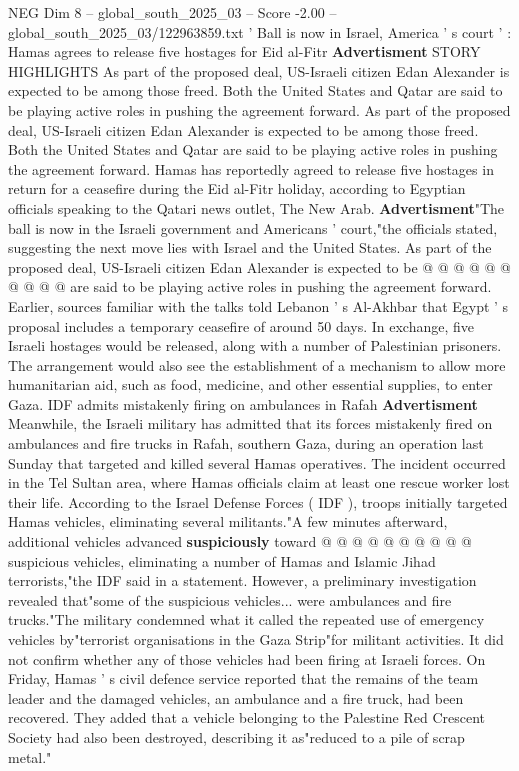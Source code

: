 \begin{textsample}{NEG Dim 8 – global\_south\_2025\_03 – Score -2.00 – global\_south\_2025\_03/122963859.txt}  \label{ex:f8_neg_071}
' Ball is now in Israel, America ' s court ' : Hamas agrees to release five hostages for Eid al-Fitr \textbf{Advertisment} STORY HIGHLIGHTS As part of the proposed deal, US-Israeli citizen Edan Alexander is expected to be among those freed.
Both the United States and Qatar are said to be playing active roles in pushing the agreement forward.
As part of the proposed deal, US-Israeli citizen Edan Alexander is expected to be among those freed.
Both the United States and Qatar are said to be playing active roles in pushing the agreement forward.
Hamas has reportedly agreed to release five hostages in return for a ceasefire during the Eid al-Fitr holiday, according to Egyptian officials speaking to the Qatari news outlet, The New Arab. \textbf{Advertisment}"The ball is now in the Israeli government and Americans ' court,"the officials stated, suggesting the next move lies with Israel and the United States.
As part of the proposed deal, US-Israeli citizen Edan Alexander is expected to be @ @ @ @ @ @ @ @ @ @ are said to be playing active roles in pushing the agreement forward.
Earlier, sources familiar with the talks told Lebanon ' s Al-Akhbar that Egypt ' s proposal includes a temporary ceasefire of around 50 days.
In exchange, five Israeli hostages would be released, along with a number of Palestinian prisoners.
The arrangement would also see the establishment of a mechanism to allow more humanitarian aid, such as food, medicine, and other essential supplies, to enter Gaza.
IDF admits mistakenly firing on ambulances in Rafah \textbf{Advertisment} Meanwhile, the Israeli military has admitted that its forces mistakenly fired on ambulances and fire trucks in Rafah, southern Gaza, during an operation last Sunday that targeted and killed several Hamas operatives.
The incident occurred in the Tel Sultan area, where Hamas officials claim at least one rescue worker lost their life.
According to the Israel Defense Forces ( IDF ), troops initially targeted Hamas vehicles, eliminating several militants."A few minutes afterward, additional vehicles advanced \textbf{suspiciously} toward @ @ @ @ @ @ @ @ @ @ suspicious vehicles, eliminating a number of Hamas and Islamic Jihad terrorists,"the IDF said in a statement.
However, a preliminary investigation revealed that"some of the suspicious vehicles... were ambulances and fire trucks."The military condemned what it called the repeated use of emergency vehicles by"terrorist organisations in the Gaza Strip"for militant activities.
It did not confirm whether any of those vehicles had been firing at Israeli forces.
On Friday, Hamas ' s civil defence service reported that the remains of the team leader and the damaged vehicles, an ambulance and a fire truck, had been recovered.
They added that a vehicle belonging to the Palestine Red Crescent Society had also been destroyed, describing it as"reduced to a pile of scrap metal."

\end{textsample}
